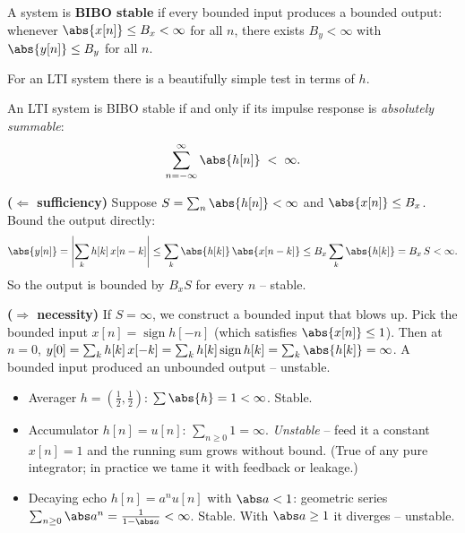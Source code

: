 \begin{definition}
\label{ch12:def-bibo}
A system is \textbf{BIBO stable} if every bounded input produces a bounded
output: whenever $\abs{x[n]}\le B_x<\infty$ for all $n$, there exists
$B_y<\infty$ with $\abs{y[n]}\le B_y$ for all $n$.
\end{definition}

For an LTI system there is a beautifully simple test in terms of $h$.

\begin{theorem}
\label{ch12:thm-bibo}
An LTI system is BIBO stable if and only if its impulse response is
\emph{absolutely summable}:
\[
  \sum_{n=-\infty}^{\infty} \abs{h[n]} \;<\; \infty.
\]
\end{theorem}

\begin{whybox}
\textbf{($\Leftarrow$ sufficiency)} Suppose $S=\sum_n\abs{h[n]}<\infty$ and
$\abs{x[n]}\le B_x$. Bound the output directly:
\[
  \abs{y[n]} = \left|\sum_k h[k]\,x[n-k]\right|
  \le \sum_k \abs{h[k]}\,\abs{x[n-k]}
  \le B_x \sum_k \abs{h[k]} = B_x\,S < \infty.
\]
So the output is bounded by $B_x S$ for every $n$ -- stable.

\textbf{($\Rightarrow$ necessity)} If $S=\infty$, we construct a bounded input
that blows up. Pick the bounded input $x[n] = \operatorname{sign} h[-n]$ (which
satisfies $\abs{x[n]}\le1$). Then at $n=0$,
$y[0]=\sum_k h[k]\,x[-k]=\sum_k h[k]\operatorname{sign}h[k]=\sum_k\abs{h[k]}=
\infty$. A bounded input produced an unbounded output -- unstable.
\end{whybox}

\begin{example}
\begin{itemize}
  \item Averager $h=(\tfrac12,\tfrac12)$: $\sum\abs{h}=1<\infty$. Stable.
  \item Accumulator $h[n]=u[n]$: $\sum_{n\ge0}1=\infty$. \emph{Unstable} -- feed
        it a constant $x[n]=1$ and the running sum grows without bound. (True of
        any pure integrator; in practice we tame it with feedback or leakage.)
  \item Decaying echo $h[n]=a^n u[n]$ with $\abs a<1$: geometric series
        $\sum_{n\ge0}\abs a^n = \tfrac{1}{1-\abs a}<\infty$. Stable. With
        $\abs a\ge1$ it diverges -- unstable.
\end{itemize}
\end{example}

